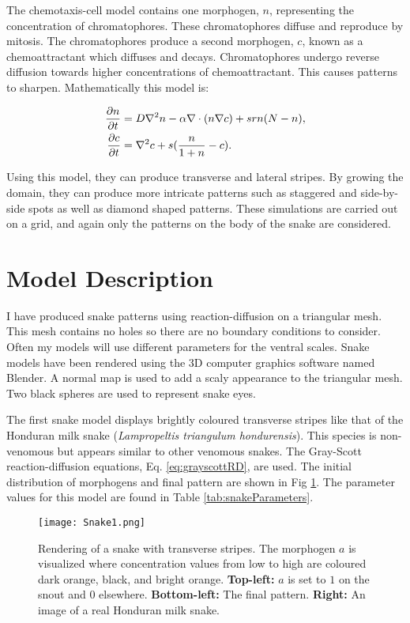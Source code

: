 The chemotaxis-cell model contains one morphogen, $n$, representing the concentration of chromatophores. These chromatophores diffuse and reproduce by mitosis. The chromatophores produce a second morphogen, $c$, known as a chemoattractant which diffuses and decays. Chromatophores undergo reverse diffusion towards higher concentrations of chemoattractant. This  causes patterns to sharpen. Mathematically this model is:

\begin{equation}
\begin{aligned} \label{eq:chemotaxis}
  \frac{\partial n}{\partial t} &= D \nabla^2{} n - \alpha \nabla \cdot{} (n\nabla{}c) + srn(N-n), \\
  \frac{\partial c}{\partial t} &= \nabla^2{} c + s(\frac{n}{1+n}-c).
\end{aligned}
\end{equation}

Using this model, they can produce transverse and lateral stripes. By growing the domain, they can produce more intricate patterns such as staggered and side-by-side spots as well as diamond shaped patterns. These simulations are carried out on a grid, and again only the patterns on the body of the snake are considered.

\newpage

\section{Model Description}
I have produced snake patterns using reaction-diffusion on a triangular mesh. This mesh contains no holes so there are no boundary conditions to consider. Often my models will use different parameters for the ventral scales. Snake models have been rendered using the 3D computer graphics software named Blender. A normal map is used to add a scaly appearance to the triangular mesh. Two black spheres are used to represent snake eyes.

The first snake model displays brightly coloured transverse stripes like that of the Honduran milk snake (\textit{Lampropeltis triangulum hondurensis}). This species is non-venomous but appears similar to other venomous snakes. The Gray-Scott reaction-diffusion equations, Eq. \ref{eq:grayscottRD}, are used. The initial distribution of morphogens and final pattern are shown in Fig \ref{fig:Snake1}. The parameter values for this model are found in Table \ref{tab:snakeParameters}.

\begin{figure}[ht]
	\centering
	\texttt{[image: Snake1.png]}
	\caption{Rendering of a snake with transverse stripes. The morphogen $a$ is visualized where concentration values from low to high are coloured dark orange, black, and bright orange. \textbf{Top-left:} $a$ is set to $1$ on the snout and $0$ elsewhere. \textbf{Bottom-left:} The final pattern. \textbf{Right:} An image of a real Honduran milk snake.}
	\label{fig:Snake1}
\end{figure}

